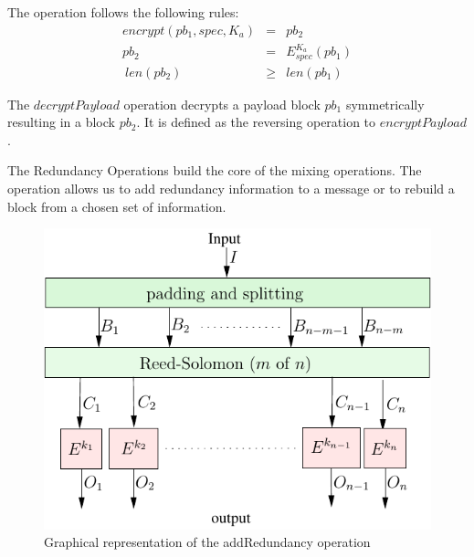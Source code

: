 \documentclass[acmsmall, screen, final, natbib=false]{acmart}
\begin{document}
	The operation follows the following rules:
	\begin{eqnarray}
	encrypt(pb_1, spec, K_a) & = & pb_2 \\
	pb_2 & = & E_{spec}^{K_a}\left( pb_1 \right)\\\
	len(pb_2) & \geq & len(pb_1)
	\end{eqnarray}
	
	
	The $decryptPayload$ operation decrypts a payload block $pb_1$ symmetrically resulting in a block $pb_2$. It is defined as the reversing operation to $encryptPayload$. 
	
	
	The Redundancy Operations build the core of the mixing operations. The operation allows us to add redundancy information to a message or to rebuild a block from a chosen set of information. 
	
	\begin{figure}[ht]\centering
		\includegraphics[width=0.5\columnwidth]{addRedundancyOp}
		\caption{Graphical representation of the addRedundancy operation}
		\label{fig:addRedundancyOperation}
	\end{figure}
	
\end{document}
